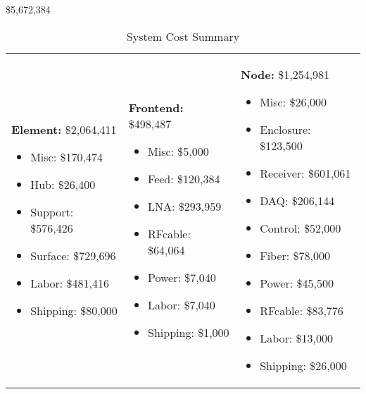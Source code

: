 \$5,672,384

\begin{table}[t]
\centering
\caption{System Cost Summary}
\label{tab:budgetsummary}
\begin{tabular}{| p{2in} | p{2in} | p{2in} | } \hline
\noindent
\textbf{Element:}  \$2,064,411
\vspace{-0.1in}
\begin{itemize}[parsep=-2pt, itemsep=-3pt]
\item Misc:   \$170,474
\item Hub:   \$26,400
\item Support:   \$576,426
\item Surface:   \$729,696
\item Labor:   \$481,416
\item Shipping:   \$80,000
\vspace{-.1in}
\end{itemize}
 &
 \noindent
\textbf{Frontend:}  \$498,487
\vspace{-0.1in}
\begin{itemize}[parsep=-2pt, itemsep=-3pt]
\item Misc:   \$5,000
\item Feed:   \$120,384
\item LNA:   \$293,959
\item RFcable:   \$64,064
\item Power:   \$7,040
\item Labor:   \$7,040
\item Shipping:   \$1,000
\vspace{-.1in}
\end{itemize}
 &
 \noindent
\textbf{Node:}  \$1,254,981
\vspace{-0.1in}
\begin{itemize}[parsep=-2pt, itemsep=-3pt]
\item Misc:   \$26,000
\item Enclosure:   \$123,500
\item Receiver:   \$601,061
\item DAQ:   \$206,144
\item Control:   \$52,000
\item Fiber:   \$78,000
\item Power:   \$45,500
\item RFcable:   \$83,776
\item Labor:   \$13,000
\item Shipping:   \$26,000
\vspace{-.1in}
\end{itemize}

\end{tabular}
\end{table}
